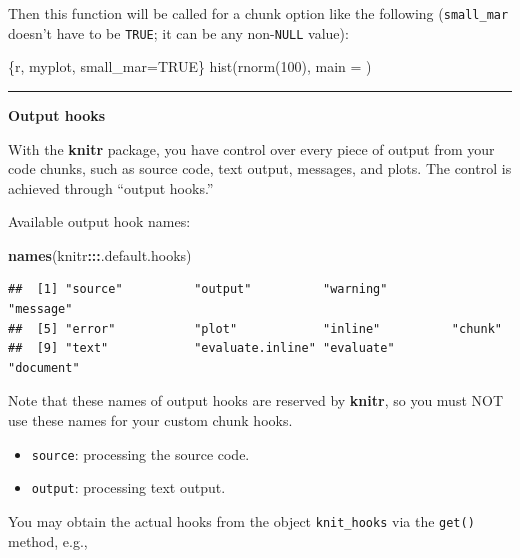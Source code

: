 \documentclass[
  a4paper,
  twoside,
  openright]{book}
\newenvironment{Shaded}{\begin{snugshade}}{\end{snugshade}}
\newcommand{\AttributeTok}[1]{\textcolor[rgb]{0.13,0.29,0.53}{#1}}
\newcommand{\FunctionTok}[1]{\textcolor[rgb]{0.13,0.29,0.53}{\textbf{#1}}}
\newcommand{\NormalTok}[1]{#1}
\newcommand{\SpecialCharTok}[1]{\textcolor[rgb]{0.81,0.36,0.00}{\textbf{#1}}}
\newcommand{\StringTok}[1]{\textcolor[rgb]{0.31,0.60,0.02}{#1}}
\providecommand{\tightlist}{%
  \setlength{\itemsep}{0pt}\setlength{\parskip}{0pt}}
\theoremstyle{definition}
\theoremstyle{definition}
\theoremstyle{definition}
\theoremstyle{definition}
\theoremstyle{remark}
\begin{document}
Then this function will be called for a chunk option like the following (\texttt{small\_mar} doesn't have to be \texttt{TRUE}; it can be any non-\texttt{NULL} value):

\begin{Shaded}
\begin{Highlighting}[]
\StringTok{\textasciigrave{}\textasciigrave{}\textasciigrave{}}\AttributeTok{\{r, myplot, small\_mar=TRUE\}}
\AttributeTok{hist(rnorm(100), main = \textquotesingle{}\textquotesingle{})}
\StringTok{\textasciigrave{}\textasciigrave{}\textasciigrave{}}
\end{Highlighting}
\end{Shaded}

\begin{center}\rule{0.5\linewidth}{0.5pt}\end{center}

\textbf{Output hooks}

With the \textbf{knitr} package, you have control over every piece of output from your code chunks, such as source code, text output, messages, and plots. The control is achieved through ``output hooks.''

Available output hook names:

\begin{Shaded}
\begin{Highlighting}[]
\FunctionTok{names}\NormalTok{(knitr}\SpecialCharTok{:::}\NormalTok{.default.hooks)}
\end{Highlighting}
\end{Shaded}

\begin{verbatim}
##  [1] "source"          "output"          "warning"         "message"        
##  [5] "error"           "plot"            "inline"          "chunk"          
##  [9] "text"            "evaluate.inline" "evaluate"        "document"
\end{verbatim}

Note that these names of output hooks are reserved by \textbf{knitr}, so you must NOT use these names for your custom chunk hooks.

\begin{itemize}
\tightlist
\item
  \texttt{source}: processing the source code.
\item
  \texttt{output}: processing text output.
\end{itemize}

You may obtain the actual hooks from the object \texttt{knit\_hooks} via the \texttt{get()} method, e.g.,
\end{document}

